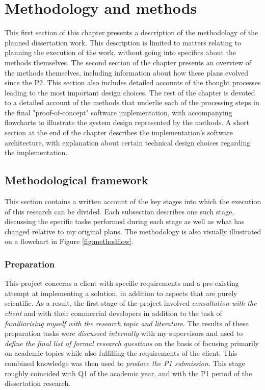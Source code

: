 
\chapter{Methodology and methods}
\label{chap:mm}

This first section of this chapter presents a description of the methodology of the planned dissertation work. This description is limited to matters relating to planning the execution of the work, without going into specifics about the methods themselves. The second section of the chapter presents an overview of the methods themselves, including information about how these plans evolved since the P2. This section also includes detailed accounts of the thought processes leading to the most important design choices. The rest of the chapter is devoted to a detailed account of the methods that underlie each of the processing steps in the final "proof-of-concept" software implementation, with accompanying flowcharts to illustrate the system design represented by the methods. A short section at the end of the chapter describes the implementation's software architecture, with explanation about certain technical design choices regarding the implementation.

\section{Methodological framework}
\label{sec:methodology}

This section contains a written account of the key stages into which the execution of this research can be divided. Each subsection describes one such stage, discussing the specific tasks performed during each stage as well as what has changed relative to my original plans. The methodology is also visually illustrated on a flowchart in Figure \ref{fig:methodflow}.

\subsection{Preparation}
\label{sub:preparation}

This project concerns a client with specific requirements and a pre-existing attempt at implementing a solution, in addition to aspects that are purely scientific. As a result, the first stage of the project involved \textit{consultation with the client} and with their commercial developers in addition to the task of \textit{familiarising myself with the research topic and literature}. The results of these preparation tasks were \textit{discussed internally} with my supervisors and used to \textit{define the final list of formal research questions} on the basis of focusing primarily on academic topics while also fulfilling the requirements of the client. This combined knowledge was then used to \textit{produce the P1 submission}. This stage roughly coincided with Q1 of the academic year, and with the P1 period of the dissertation research.

